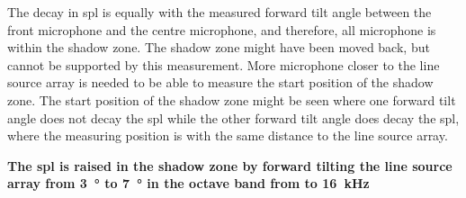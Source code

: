 The decay in \gls{spl} is equally with the measured forward tilt angle between the front microphone and the centre microphone, and therefore, all microphone is within the shadow zone. The shadow zone might have been moved back, but cannot be supported by this measurement. More microphone closer to the line source array is needed to be able to measure the start position of the shadow zone. The start position of the shadow zone might be seen where one forward tilt angle does not decay the \gls{spl} while the other forward tilt angle does decay the \gls{spl}, where the measuring position is with the same distance to the line source array.

\textbf{The \gls{spl} is raised in the shadow zone by forward tilting the line source array from \SI{3}{\degree} to \SI{7}{\degree} in the octave band from  to \SI{16}{\kilo\hertz} }